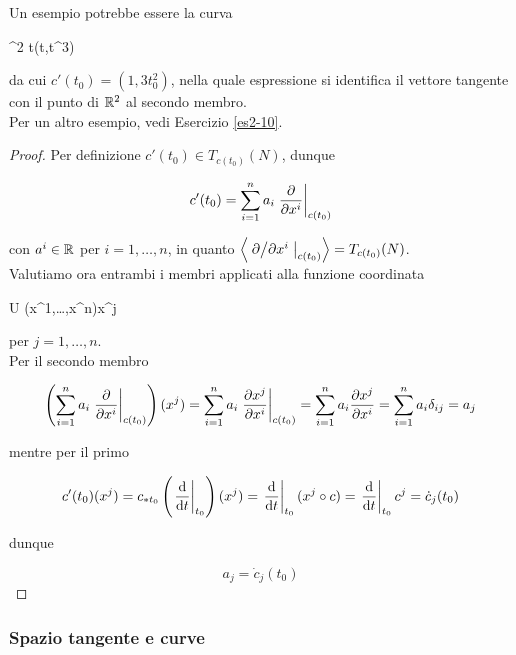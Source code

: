 Un esempio potrebbe essere la curva

	{\R}{\R^{2}}
	{t}{(t,t^{3})}

da cui $ c'(t_{0}) = (1, 3 t_{0}^{2}) $, nella quale espressione si identifica il vettore tangente con il punto di $ \mathbb{R}^{2} $ al secondo membro.\\
Per un altro esempio, vedi Esercizio \ref{es2-10}.

\begin{proof}
	Per definizione $ c'(t_{0}) \in T_{c(t_{0})}(N) $, dunque
	
	\begin{equation}
		c'(t_{0}) = \sum_{i=1}^{n} a_{i} \eval{ \pdv{x^{i}} }_{c(t_{0})}
	\end{equation}

	con $ a^{i} \in \mathbb{R} $ per $ i=1,\dots,n $, in quanto $ \ev{ \eval{ \pdv*{x^{i}} }_{c(t_{0})} } = T_{c(t_{0})}(N) $.\\
	Valutiamo ora entrambi i membri applicati alla funzione coordinata
	
		{U}{\R}
		{(x^{1},\dots,x^{n})}{x^{j}}

	per $ j=1,\dots,n $.\\
	Per il secondo membro
	
	\begin{equation}
		\left( \sum_{i=1}^{n} a_{i} \eval{ \pdv{x^{i}} }_{c(t_{0})} \right) (x^{j}) = \sum_{i=1}^{n} a_{i} \eval{ \pdv{x^{j}}{x^{i}} }_{c(t_{0})} %
		= \sum_{i=1}^{n} a_{i} \pdv{x^{j}}{x^{i}} %
		= \sum_{i=1}^{n} a_{i} \delta_{ij} %
		= a_{j}
	\end{equation}

	mentre per il primo
	
	\begin{equation}
		c'(t_{0})(x^{j}) = c_{*t_{0}} \left( \eval{ \dv{t} }_{t_{0}} \right)(x^{j}) %
		= \eval{ \dv{t} }_{t_{0}} (x^{j} \circ c) %
		= \eval{ \dv{t} }_{t_{0}} c^{j} %
		= \dot{c}_{j}(t_{0})
	\end{equation}

	dunque
	
	\begin{equation}
		a_{j} = \dot{c}_{j}(t_{0})
	\end{equation}
\end{proof}

\subsubsection{Spazio tangente e curve}

